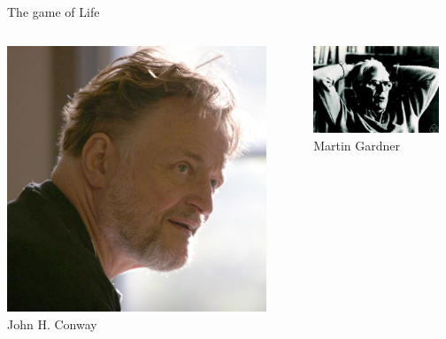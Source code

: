 \documentclass{beamer}
\begin{document}
\begin{frame}{The game of Life}

	\begin{columns}[onlytextwidth]
	\begin{column}{0.5\textwidth}
		\centering
		\includegraphics[width=0.9\textwidth]{conway} \\
		John H. Conway
	\end{column}

	\begin{column}{0.5\textwidth}
		\centering
		\includegraphics[width=0.9\textwidth]{gardner} \\
		Martin Gardner
	\end{column}
	\end{columns}
\end{frame}
\end{document}
